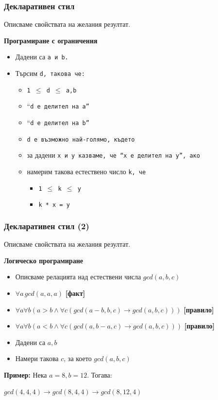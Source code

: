 \documentclass{beamer}
\begin{document}
\begin{frame}
  \frametitle{Декларативен стил}

  Описваме свойствата на желания резултат.
  \vspace{1em}

  \textbf{Програмиране с ограничения}

  \begin{itemize}
  \item Дадени са \tt a и \tt b.
  \item Търсим \tt d, такова че:
    \begin{itemize}
    \item \tt{1 $\leq$ d $\leq$ a,b}
    \item ``\tt d е делител на \tt a''
    \item ``\tt d е делител на \tt b''
    \item \tt d е възможно най-голямо, където
    \item за дадени \tt x и \tt y казваме, че ``\tt x е делител на \tt y'', ако
    \item намерим такова естествено число \tt k, че
      \begin{itemize}
      \item \tt{1 $\leq$ k $\leq$ y}
      \item \tt k * \tt x = \tt y
      \end{itemize}
    \end{itemize}
  \end{itemize}
\end{frame}

\begin{frame}
  \frametitle{Декларативен стил (2)}

  Описваме свойствата на желания резултат.
  \vspace{1em}

  \textbf{Логическо програмиране}

  \begin{itemize}
  \item Описваме релацията над естествени числа $gcd(a,b,c)$
  \item $\forall a \, gcd(a,a,a)$ \textbf{[факт]}

  \item $\forall a\forall b ( a > b \land \forall c (gcd(a-b,b,c) \rightarrow gcd(a,b,c)))$ \textbf{[правило]}
  \item $\forall a\forall b ( a < b \land \forall c (gcd(a,b-a,c) \rightarrow gcd(a,b,c)))$ \textbf{[правило]}
  \item Дадени са $a, b$
  \item Намери такова $c$, за което $gcd(a,b,c)$
  \end{itemize}

  \pause

  \textbf{Пример:}
  Нека $a = 8, b = 12$. Тогава:

  $gcd(4,4,4) \rightarrow gcd(8,4,4) \rightarrow gcd(8,12,4)$
\end{frame}
\end{document}
